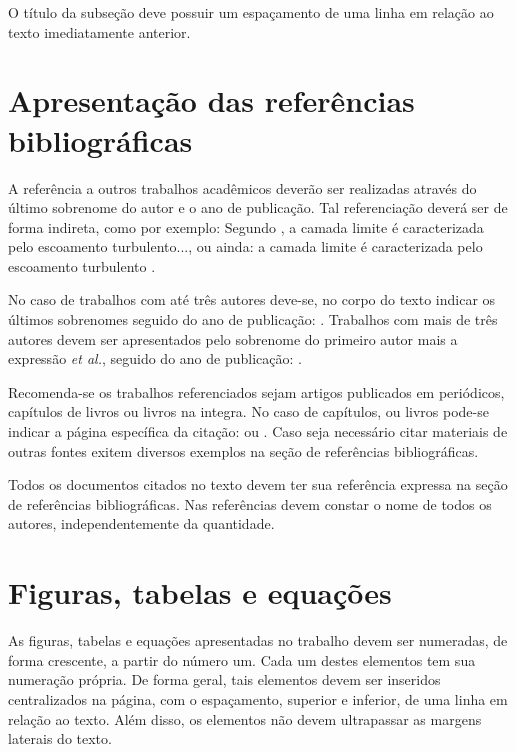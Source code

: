 \documentclass[]{workmicro2019} %
\begin{document}
\par O título da subseção deve possuir um espaçamento de uma linha em relação ao texto imediatamente anterior. 

\section{Apresentação das referências bibliográficas}

\par A referência a outros trabalhos acadêmicos deverão ser realizadas através do último sobrenome do autor e o ano de publicação. Tal referenciação deverá ser de forma indireta, como por exemplo: Segundo , a camada limite é caracterizada pelo escoamento turbulento..., ou ainda: a camada limite é caracterizada pelo escoamento turbulento \cite{livro:stull1988}. 

\par No caso de trabalhos com até três autores deve-se, no corpo do texto indicar os últimos sobrenomes seguido do ano de publicação: \cite{artigo:witek2011}. Trabalhos com mais de três autores devem ser apresentados pelo sobrenome do primeiro autor mais a expressão \textit{et al.}, seguido do ano de publicação: \cite{artigo:puhales2015}.

\par Recomenda-se os trabalhos referenciados sejam artigos publicados em periódicos, capítulos de livros ou livros na integra. No caso de capítulos, ou livros pode-se indicar a página específica da citação: \cite[p. 5]{livro:stull1988} ou . Caso seja necessário citar materiais de outras fontes exitem diversos exemplos na seção de referências bibliográficas.

\par Todos os documentos citados no texto devem ter sua referência expressa na seção de referências bibliográficas. Nas referências devem constar o nome de todos os autores, independentemente da quantidade.


\section{Figuras, tabelas e equações}

\par As figuras, tabelas e equações apresentadas no trabalho devem ser numeradas, de forma crescente, a partir do número um. Cada um destes elementos tem sua numeração própria. De forma geral, tais elementos devem ser inseridos centralizados na página, com o espaçamento, superior e inferior, de uma linha em relação ao texto. Além disso, os elementos não devem ultrapassar as margens laterais do texto.
\end{document}
